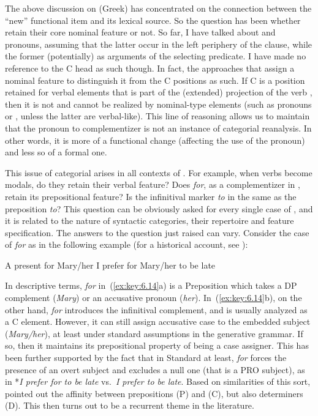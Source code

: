\documentclass[output=paper]{langsci/langscibook}
\begin{document}
The above discussion on (Greek)  has concentrated on the
connection between the \enquote{new} functional item and its lexical source. So
the question has been whether  retain their core nominal
feature or not. So far, I have talked about  and pronouns,
assuming that the latter occur in the left periphery of the clause, while the
former (potentially) as arguments of the selecting predicate. I have made no
reference to the C head as such though. In fact, the approaches that assign a
nominal feature to  distinguish it from the C positions as
such. If C is a position retained for verbal elements that is part of the
(extended) projection of the verb \parencite{ManSav2011}, then it is not and
cannot be realized by nominal-type elements (such as pronouns or
, unless the latter are verbal-like). This line of
reasoning allows us to maintain that the pronoun to
complementizer  is not an instance of
categorial reanalysis. In other words, it is more of a functional change
(affecting the use of the pronoun) and less so of a formal one.

This issue of categorial  arises in
all contexts of . For example, when verbs become modals, do
they retain their verbal feature? Does \emph{for}, as a
complementizer in , retain its prepositional
feature? Is the infinitival marker \emph{to} in  the same as the
preposition \emph{to}? This question can be obviously asked for every single
case of , and it is related to the nature of syntactic
categories, their repertoire and feature specification. The answers to the
question just raised can vary. Consider the case of \emph{for} as in the
following example (for a historical account, see \citealt{vanGelderen2010}):

\ea\label{ex:key:6.14}
	\ea A present for Mary/her
	\ex I prefer for Mary/her to be late
	\z
\z

In descriptive terms, \emph{for} in~(\ref{ex:key:6.14}a) is a Preposition which takes a DP
complement (\emph{Mary}) or an accusative pronoun (\emph{her}). In~(\ref{ex:key:6.14}b), on
the other hand, \emph{for} introduces the infinitival complement, and is
usually analyzed as a C element. However, it can still assign accusative case
to the embedded subject (\emph{Mary/her}), at least under standard assumptions
in the generative grammar. If so, then it maintains its prepositional property
of being a case assigner. This has been further supported by the fact that in
Standard  at least, \emph{for} forces the presence of an overt subject
and excludes a null one (that is a PRO subject), as in *\emph{I prefer for to
be late} vs.\ \emph{I prefer to be late}. Based on similarities of this sort,
\parencite{Kayne1984,Kayne2000b} pointed out the affinity between prepositions
(P) and  (C), but also determiners (D). This then turns out to
be a recurrent theme in the literature.
\end{document}
